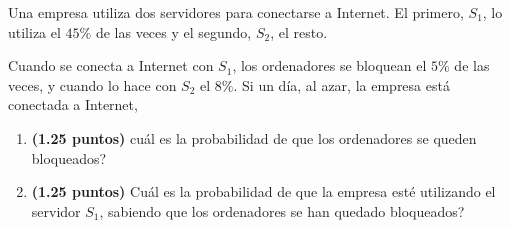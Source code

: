 
Una empresa utiliza dos servidores para conectarse a Internet. El primero, $S_1$, lo utiliza el $45\%$ de las veces y el segundo, $S_2$, el resto.

Cuando se conecta a Internet con $S_1$, los ordenadores se bloquean el $5\%$ de las veces, y cuando lo hace con $S_2$ el $8\%$. Si un día, al azar, la empresa está conectada a Internet,
\begin{enumerate}[label=\alph*)]
\item \textbf{(1.25 puntos)} \textquestiondown{}cuál es la probabilidad de que los ordenadores se queden bloqueados?
\item \textbf{(1.25 puntos)} \textquestiondown{}Cuál es la probabilidad de que la empresa esté utilizando el servidor $S_1$, sabiendo que los ordenadores se han quedado bloqueados?
\end{enumerate}
